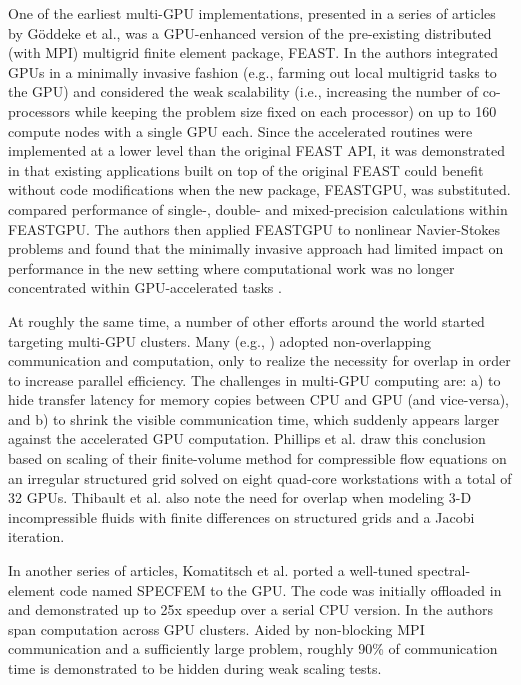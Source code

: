 \documentclass[11pt]{report}
\begin{document}
One of the earliest multi-GPU implementations, presented in a series of articles \cite{Goeddeke2007, Goeddeke2008a, Goeddeke2008b, Goeddeke2009a} by G\"{o}ddeke et al., was
a GPU-enhanced version of the pre-existing distributed (with MPI) multigrid finite element package, FEAST. In \cite{Goeddeke2007} the authors integrated 
GPUs in a minimally invasive fashion (e.g., farming out local multigrid tasks to the GPU) and considered the weak scalability (i.e., 
increasing the number of co-processors while keeping the problem size fixed on each processor) on up to 160 compute nodes with a 
single GPU each.  Since the accelerated routines were implemented at a lower level than the original FEAST API, it was demonstrated in 
\cite{Goeddeke2008a} that existing applications built on top of the original FEAST could benefit without code modifications when 
the 
new package, FEASTGPU, was substituted. \cite{Goeddeke2008b} compared performance of single-,  double- and 
mixed-precision calculations within FEASTGPU. The authors then applied FEASTGPU to nonlinear Navier-Stokes 
problems and 
found that the minimally invasive approach had limited impact on performance in the new setting where computational work was no longer  
concentrated within GPU-accelerated tasks \cite{Goeddeke2009a}. 

At roughly the same time, a number of other efforts around the world started targeting multi-GPU clusters. Many (e.g., \cite{Phillips2009, Thibault2009, Komatitsch2009}) adopted non-overlapping communication and computation, only to realize the necessity for overlap in order to increase parallel efficiency. The challenges in multi-GPU computing are: a) to hide transfer latency for memory copies between CPU and GPU (and vice-versa), and b) to shrink the visible communication time, which suddenly appears larger against the accelerated GPU computation.
Phillips et al. draw this conclusion based on scaling of their finite-volume method for compressible flow equations on an irregular structured grid solved on eight quad-core workstations with a total of 32 GPUs. 
Thibault et al. \cite{Thibault2009} also note the need for overlap when modeling 3-D incompressible fluids with finite differences on structured grids and a Jacobi iteration. %

In another series of articles, Komatitsch et al. \cite{Komatitsch2009, Komatitsch2010b,Komatitsch2010a} ported a well-tuned spectral-element code named SPECFEM to the GPU. The code was initially offloaded in \cite{Komatitsch2009} and demonstrated up to 25x speedup over a serial CPU version. In \cite{Komatitsch2010b,Komatitsch2010a} the authors span computation across GPU clusters. Aided by non-blocking MPI communication and a sufficiently large problem, roughly 90\% of communication time is demonstrated to be hidden during weak scaling tests. 
\end{document}
